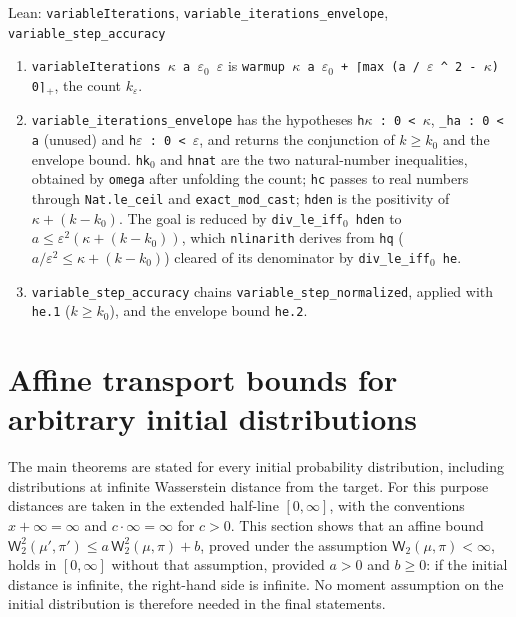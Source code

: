\documentclass[11pt,a4paper]{report}
\begin{document}
\begin{leanbox}{Lean: \texttt{variableIterations}, \texttt{variable\_\allowbreak{}iterations\_\allowbreak{}envelope}, \texttt{variable\_\allowbreak{}step\_\allowbreak{}accuracy}}
\begin{enumerate}
\item \texttt{variable\allowbreak{}Iterations \ensuremath{\kappa} a \ensuremath{\varepsilon}\ensuremath{{}_{0}} \ensuremath{\varepsilon}} is \texttt{warmup \ensuremath{\kappa} a \ensuremath{\varepsilon}\ensuremath{{}_{0}} + ⌈max (a /\allowbreak{} \ensuremath{\varepsilon} \textasciicircum{} 2 -\allowbreak{} \ensuremath{\kappa}) 0⌉\ensuremath{{}_{+}}}, the count \(k_\varepsilon\).

\item \texttt{variable\_\allowbreak{}iterations\_\allowbreak{}envelope} has the hypotheses \texttt{h\ensuremath{\kappa} : 0 < \ensuremath{\kappa}}, \texttt{\_\allowbreak{}ha : 0 < a} (unused) and \texttt{h\ensuremath{\varepsilon} : 0 < \ensuremath{\varepsilon}}, and returns the conjunction of \(k\ge k_0\) and the envelope bound. \texttt{hk\ensuremath{{}_{0}}} and \texttt{hnat} are the two natural-number inequalities, obtained by \texttt{omega} after unfolding the count; \texttt{hc} passes to real numbers through \texttt{Nat.\allowbreak{}le\_\allowbreak{}ceil} and \texttt{exact\_\allowbreak{}mod\_\allowbreak{}cast}; \texttt{hden} is the positivity of \(\kappa+(k-k_0)\). The goal is reduced by \texttt{div\_\allowbreak{}le\_\allowbreak{}iff\ensuremath{{}_{0}} hden} to \(a\le\varepsilon^2(\kappa+(k-k_0))\), which \texttt{nlinarith} derives from \texttt{hq} (\(a/\varepsilon^2\le\kappa+(k-k_0)\)) cleared of its denominator by \texttt{div\_\allowbreak{}le\_\allowbreak{}iff\ensuremath{{}_{0}} he}.

\item \texttt{variable\_\allowbreak{}step\_\allowbreak{}accuracy} chains \texttt{variable\_\allowbreak{}step\_\allowbreak{}normalized}, applied with \texttt{he.\allowbreak{}1} (\(k\ge k_0\)), and the envelope bound \texttt{he.\allowbreak{}2}.

\end{enumerate}
\end{leanbox}
\section{\texorpdfstring{Affine transport bounds for arbitrary initial distributions}{Affine transport bounds for arbitrary initial distributions}}
\label{proof-module-AverageLMC-ExtendedTransport-lean}


The main theorems are stated for every initial probability distribution, including distributions at infinite Wasserstein distance from the target. For this purpose distances are taken in the extended half-line \([0,\infty]\), with the conventions \(x+\infty=\infty\) and \(c\cdot\infty=\infty\) for \(c>0\). This section shows that an affine bound \(\mathsf W_2^2(\mu',\pi')\le a\,\mathsf W_2^2(\mu,\pi)+b\), proved under the assumption \(\mathsf W_2(\mu,\pi)<\infty\), holds in \([0,\infty]\) without that assumption, provided \(a>0\) and \(b\ge0\): if the initial distance is infinite, the right-hand side is infinite. No moment assumption on the initial distribution is therefore needed in the final statements.
\end{document}
